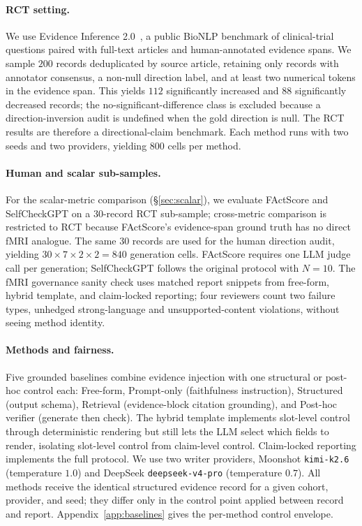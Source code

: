 \documentclass[10pt,twocolumn]{article}
\begin{document}
\paragraph{RCT setting.} We use Evidence Inference 2.0~\citep{ref_ei2}, a public BioNLP benchmark of clinical-trial questions paired with full-text articles and human-annotated evidence spans. We sample $200$ records deduplicated by source article, retaining only records with annotator consensus, a non-null direction label, and at least two numerical tokens in the evidence span. This yields $112$ significantly increased and $88$ significantly decreased records; the no-significant-difference class is excluded because a direction-inversion audit is undefined when the gold direction is null. The RCT results are therefore a directional-claim benchmark. Each method runs with two seeds and two providers, yielding $800$ cells per method.

\paragraph{Human and scalar sub-samples.} For the scalar-metric comparison (\S\ref{sec:scalar}), we evaluate FActScore and SelfCheckGPT on a $30$-record RCT sub-sample; cross-metric comparison is restricted to RCT because FActScore's evidence-span ground truth has no direct fMRI analogue. The same $30$ records are used for the human direction audit, yielding $30\times7\times2\times2=840$ generation cells. FActScore requires one LLM judge call per generation; SelfCheckGPT follows the original protocol with $N=10$. The fMRI governance sanity check uses matched report snippets from free-form, hybrid template, and claim-locked reporting; four reviewers count two failure types, unhedged strong-language and unsupported-content violations, without seeing method identity.

\paragraph{Methods and fairness.} Five grounded baselines combine evidence injection with one structural or post-hoc control each: Free-form, Prompt-only (faithfulness instruction), Structured (output schema), Retrieval (evidence-block citation grounding), and Post-hoc verifier (generate then check). The hybrid template implements slot-level control through deterministic rendering but still lets the LLM select which fields to render, isolating slot-level control from claim-level control. Claim-locked reporting implements the full protocol. We use two writer providers, Moonshot \texttt{kimi-k2.6} (temperature $1.0$) and DeepSeek \texttt{deepseek-v4-pro} (temperature $0.7$). All methods receive the identical structured evidence record for a given cohort, provider, and seed; they differ only in the control point applied between record and report. Appendix~\ref{app:baselines} gives the per-method control envelope.
\end{document}
